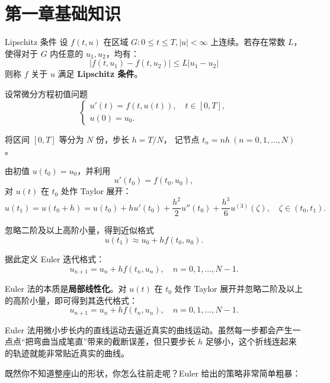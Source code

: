 \chapter{第一章基础知识}
\begin{definition}{Lipschitz 条件}
设 $f(t,u)$ 在区域 $G: 0 \le t \le T, |u| < \infty$ 上连续。若存在常数 $L$，使得对于 $G$ 内任意的 $u_1, u_2$，均有：
\begin{equation}
    |f(t, u_1) - f(t, u_2)| \le L |u_1 - u_2|
\end{equation}
则称 $f$ 关于 $u$ 满足 \textbf{Lipschitz 条件}。
\end{definition}
\begin{definition}
设常微分方程初值问题
\[
\begin{cases}
u'(t) = f(t,u(t)), \quad t \in [0,T], \\
u(0) = u_0.
\end{cases}
\]

将区间 $[0,T]$ 等分为 $N$ 份，步长 $h = T/N$，
记节点 $t_n = nh \ (n=0,1,\dots,N)$。

由初值 $u(t_0)=u_0$，并利用
\[
u'(t_0) = f(t_0,u_0),
\]
对 $u(t)$ 在 $t_0$ 处作 Taylor 展开：
\[
u(t_1)=u(t_0+h)
= u(t_0) + h u'(t_0)
+ \frac{h^2}{2} u''(t_0)
+ \frac{h^3}{6} u^{(3)}(\zeta),
\quad \zeta \in (t_0,t_1).
\]

忽略二阶及以上高阶小量，得到近似格式
\[
u(t_1) \approx u_0 + h f(t_0,u_0).
\]

据此定义 Euler 迭代格式：
\[
\boxed{
u_{n+1} = u_n + h f(t_n,u_n), \quad n=0,1,\dots,N-1.
}
\]
\end{definition}
\begin{note}
Euler 法的本质是\textbf{局部线性化}。对 $u(t)$ 在 $t_0$ 处作 Taylor 展开并忽略二阶及以上的高阶小量，即可得到其迭代格式：
\begin{equation*}
    u_{n+1} = u_n + hf(t_n, u_n), \quad n = 0, 1, \dots, N-1.
\end{equation*}

Euler 法用微小步长内的直线运动去逼近真实的曲线运动。虽然每一步都会产生一点点“把弯曲当成笔直”带来的截断误差，但只要步长 $h$ 足够小，这个折线连起来的轨迹就能非常贴近真实的曲线。
\end{note}
既然你不知道整座山的形状，你怎么往前走呢？Euler 给出的策略非常简单粗暴：

